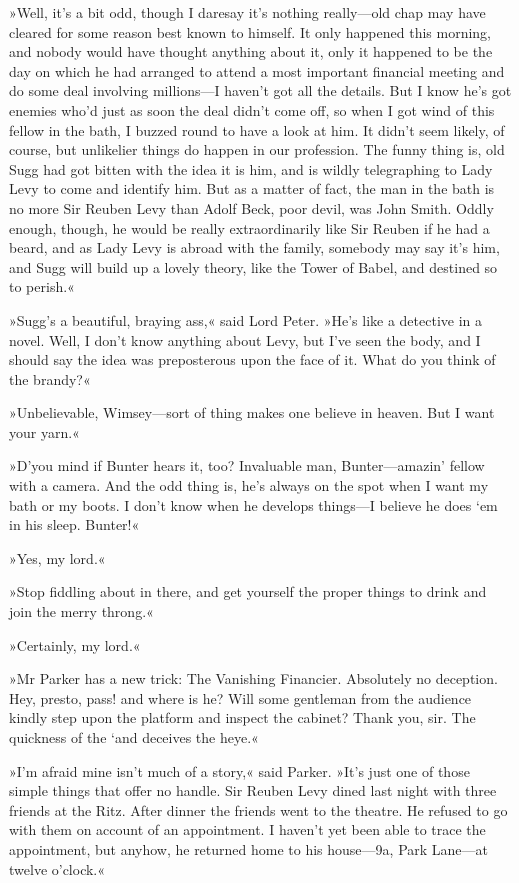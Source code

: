 »Well, it's a bit odd, though I daresay it's nothing really—old chap may have cleared for some reason best known to himself. It only happened this morning, and nobody would have thought anything about it, only it happened to be the day on which he had arranged to attend a most important financial meeting and do some deal involving millions—I haven't got all the details. But I know he's got enemies who'd just as soon the deal didn't come off, so when I got wind of this fellow in the bath, I buzzed round to have a look at him. It didn't seem likely, of course, but unlikelier things do happen in our profession. The funny thing is, old Sugg had got bitten with the idea it is him, and is wildly telegraphing to Lady Levy to come and identify him. But as a matter of fact, the man in the bath is no more Sir Reuben Levy than Adolf Beck, poor devil, was John Smith. Oddly enough, though, he would be really extraordinarily like Sir Reuben if he had a beard, and as Lady Levy is abroad with the family, somebody may say it's him, and Sugg will build up a lovely theory, like the Tower of Babel, and destined so to perish.«

»Sugg's a beautiful, braying ass,« said Lord Peter. »He's like a detective in a novel. Well, I don't know anything about Levy, but I've seen the body, and I should say the idea was preposterous upon the face of it. What do you think of the brandy?«

»Unbelievable, Wimsey—sort of thing makes one believe in heaven. But I want your yarn.«

»D'you mind if Bunter hears it, too? Invaluable man, Bunter—amazin' fellow with a camera. And the odd thing is, he's always on the spot when I want my bath or my boots. I don't know when he develops things—I believe he does `em in his sleep. Bunter!«

»Yes, my lord.«

»Stop fiddling about in there, and get yourself the proper things to drink and join the merry throng.«

»Certainly, my lord.«

»Mr Parker has a new trick: The Vanishing Financier. Absolutely no deception. Hey, presto, pass! and where is he? Will some gentleman from the audience kindly step upon the platform and inspect the cabinet? Thank you, sir. The quickness of the `and deceives the heye.«

»I'm afraid mine isn't much of a story,« said Parker. »It's just one of those simple things that offer no handle. Sir Reuben Levy dined last night with three friends at the Ritz. After dinner the friends went to the theatre. He refused to go with them on account of an appointment. I haven't yet been able to trace the appointment, but anyhow, he returned home to his house—9a, Park Lane—at twelve o'clock.«

